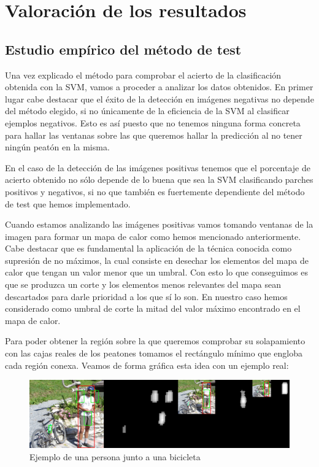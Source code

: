 \documentclass[a4paper,12pt]{article}
\begin{document}

\section{Valoración de los resultados}

\subsection{Estudio empírico del método de test}

Una vez explicado el método para comprobar el acierto de la clasificación obtenida con la SVM, vamos a proceder a analizar los datos obtenidos. En primer lugar cabe destacar que el éxito de la detección en imágenes negativas no depende del método elegido, si no únicamente de la eficiencia de la SVM al clasificar ejemplos negativos. Esto es así puesto que no tenemos ninguna forma concreta para hallar las ventanas sobre las que queremos hallar la predicción al no tener ningún peatón en la misma.

En el caso de la detección de las imágenes positivas tenemos que el porcentaje de acierto obtenido no sólo depende de lo buena que sea la SVM clasificando parches positivos y negativos, si no que también es fuertemente dependiente del método de test que hemos implementado.

Cuando estamos analizando las imágenes positivas vamos tomando ventanas de la imagen para formar un mapa de calor como hemos mencionado anteriormente. Cabe destacar que es fundamental la aplicación de la técnica conocida como supresión de no máximos, la cual consiste en desechar los elementos del mapa de calor que tengan un valor menor que un umbral. Con esto lo que conseguimos es que se produzca un corte y los elementos menos relevantes del mapa sean descartados para darle prioridad a los que sí lo son. En nuestro caso hemos considerado como umbral de corte la mitad del valor máximo encontrado en el mapa de calor.

Para poder obtener la región sobre la que queremos comprobar su solapamiento con las cajas reales de los peatones tomamos el rectángulo mínimo que engloba cada región conexa. Veamos de forma gráfica esta idea con un ejemplo real:

\begin{figure}[H]
	\includegraphics[scale=0.16]{./Imagenes/test01.jpg}
	\caption{Ejemplo de una persona junto a una bicicleta}
\end{figure}
\end{document}
